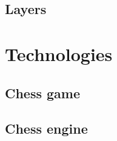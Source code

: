 
\subsection{Layers}
\label{subsec:ch5sec1subsec2}

\section{Technologies}
\label{sec:ch5sec2}


\subsection{Chess game}
\label{subsec:ch5sec2subsec1}


\subsection{Chess engine}
\label{subsec:ch5sec2subsec2}

